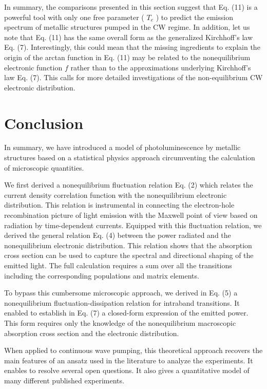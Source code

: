 \documentclass[10pt]{article}
\begin{document}
In summary, the comparisons presented in this section suggest that Eq. (11) is a powerful tool with only one free parameter ( $T_{e}$ ) to predict the emission spectrum of metallic structures pumped in the CW regime. In addition, let us note that Eq. (11) has the same overall form as the generalized Kirchhoff's law Eq. (7). Interestingly, this could mean that the missing ingredients to explain the origin of the arctan function in Eq. (11) may be related to the nonequilibrium electronic function $f$ rather than to the approximations underlying Kirchhoff's law Eq. (7). This calls for more detailed investigations of the non-equilibrium CW electronic distribution.

\section*{Conclusion}
In summary, we have introduced a model of photoluminescence by metallic structures based on a statistical physics approach circumventing the calculation of microscopic quantities.

We first derived a nonequilibrium fluctuation relation Eq. (2) which relates the current density correlation function with the nonequilibrium electronic distribution. This relation is instrumental in connecting the electron-hole recombination picture of light emission with the Maxwell point of view based on radiation by time-dependent currents. Equipped with this fluctuation relation, we derived the general relation Eq. (4) between the power radiated and the nonequilibrium electronic distribution. This relation shows that the absorption cross section can be used to capture the spectral and directional shaping of the emitted light. The full calculation requires a sum over all the transitions including the corresponding populations and matrix elements.

To bypass this cumbersome microscopic approach, we derived in Eq. (5) a nonequilibrium fluctuation-dissipation relation for intraband transitions. It enabled to establish in Eq. (7) a closed-form expression of the emitted power. This form requires only the knowledge of the nonequilibrium macroscopic absorption cross section and the electronic distribution.

When applied to continuous wave pumping, this theoretical approach recovers the main features of an ansatz used in the literature to analyze the experiments. It enables to resolve several open questions. It also gives a quantitative model of many different published experiments.
\end{document}
